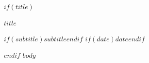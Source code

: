 \documentclass[11pt,a4paper]{article}
\begin{document}
$if(title)$
{\sffamily\color{ink}\fontsize{20}{27}\selectfont\bfseries $title$\par}
$if(subtitle)${\sffamily\small\color{secondary}$subtitle$}$endif$
$if(date)$\hfill{\sffamily\small\color{secondary}$date$}$endif$
\par\vspace{1mm}
$endif$
$body$
\end{document}
